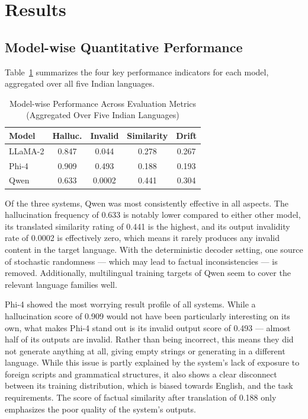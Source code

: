 \documentclass[conference]{IEEEtran}
\begin{document}
\section{Results}

\subsection{Model-wise Quantitative Performance}

Table~\ref{tab:results} summarizes the four key performance indicators 
for each model, aggregated over all five Indian languages.

\begin{table}[htbp]
\caption{Model-wise Performance Across Evaluation Metrics 
(Aggregated Over Five Indian Languages)}
\centering
\renewcommand{\arraystretch}{1.2}
\begin{tabular}{lcccc}
\toprule
\textbf{Model} & \textbf{Halluc.} & \textbf{Invalid} 
& \textbf{Similarity} & \textbf{Drift} \\
\midrule
LLaMA-2 & 0.847 & 0.044 & 0.278 & 0.267 \\
Phi-4   & 0.909 & 0.493 & 0.188 & 0.193 \\
Qwen    & 0.633 & 0.0002 & 0.441 & 0.304 \\
\bottomrule
\end{tabular}
\label{tab:results}
\end{table}

Of the three systems, Qwen was most consistently effective in all aspects.
The hallucination frequency of 0.633 is notably lower compared
to either other model, its translated similarity rating of 0.441 is the
highest, and its output invalidity rate of 0.0002 is effectively
zero, which means it rarely produces any invalid content in the target language. With the deterministic decoder setting, one source of
stochastic randomness — which may lead to factual inconsistencies — is removed. Additionally, multilingual training targets of Qwen seem
to cover the relevant language families well.

Phi-4 showed the most worrying result profile of all systems.
While a hallucination score of 0.909 would not have been
particularly interesting on its own, what makes Phi-4 stand
out is its invalid output score of 0.493 — almost half of
its outputs are invalid. Rather than being incorrect, this
means they did not generate anything at all, giving empty
strings or generating in a different language. While this
issue is partly explained by the system's lack of exposure
to foreign scripts and grammatical structures, it also shows
a clear disconnect between its training distribution, which
is biased towards English, and the task requirements.
The score of factual similarity after translation of 0.188
only emphasizes the poor quality of the system's outputs.
\end{document}
